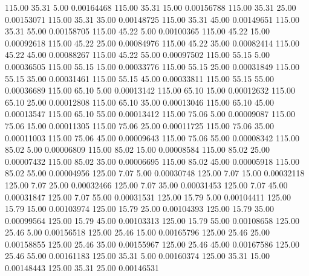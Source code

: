     115.00     35.31      5.00     0.00164468
    115.00     35.31     15.00     0.00156788
    115.00     35.31     25.00     0.00153071
    115.00     35.31     35.00     0.00148725
    115.00     35.31     45.00     0.00149651
    115.00     35.31     55.00     0.00158705
    115.00     45.22      5.00     0.00100365
    115.00     45.22     15.00     0.00092618
    115.00     45.22     25.00     0.00084976
    115.00     45.22     35.00     0.00082414
    115.00     45.22     45.00     0.00088267
    115.00     45.22     55.00     0.00097502
    115.00     55.15      5.00     0.00036505
    115.00     55.15     15.00     0.00033776
    115.00     55.15     25.00     0.00031849
    115.00     55.15     35.00     0.00031461
    115.00     55.15     45.00     0.00033811
    115.00     55.15     55.00     0.00036689
    115.00     65.10      5.00     0.00013142
    115.00     65.10     15.00     0.00012632
    115.00     65.10     25.00     0.00012808
    115.00     65.10     35.00     0.00013046
    115.00     65.10     45.00     0.00013547
    115.00     65.10     55.00     0.00013412
    115.00     75.06      5.00     0.00009087
    115.00     75.06     15.00     0.00011305
    115.00     75.06     25.00     0.00011725
    115.00     75.06     35.00     0.00011003
    115.00     75.06     45.00     0.00009643
    115.00     75.06     55.00     0.00008342
    115.00     85.02      5.00     0.00006809
    115.00     85.02     15.00     0.00008584
    115.00     85.02     25.00     0.00007432
    115.00     85.02     35.00     0.00006695
    115.00     85.02     45.00     0.00005918
    115.00     85.02     55.00     0.00004956
    125.00      7.07      5.00     0.00030748
    125.00      7.07     15.00     0.00032118
    125.00      7.07     25.00     0.00032466
    125.00      7.07     35.00     0.00031453
    125.00      7.07     45.00     0.00031847
    125.00      7.07     55.00     0.00031531
    125.00     15.79      5.00     0.00104411
    125.00     15.79     15.00     0.00103974
    125.00     15.79     25.00     0.00104393
    125.00     15.79     35.00     0.00099564
    125.00     15.79     45.00     0.00103313
    125.00     15.79     55.00     0.00108658
    125.00     25.46      5.00     0.00156518
    125.00     25.46     15.00     0.00165796
    125.00     25.46     25.00     0.00158855
    125.00     25.46     35.00     0.00155967
    125.00     25.46     45.00     0.00167586
    125.00     25.46     55.00     0.00161183
    125.00     35.31      5.00     0.00160374
    125.00     35.31     15.00     0.00148443
    125.00     35.31     25.00     0.00146531
